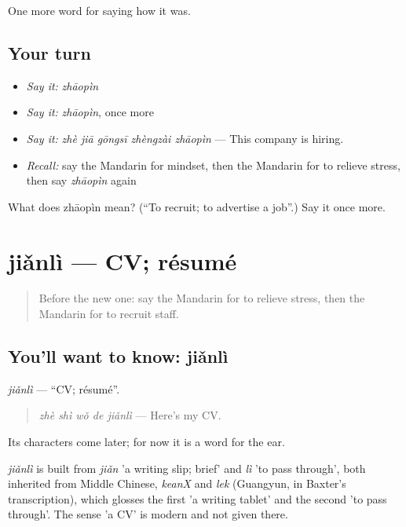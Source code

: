 \begin{grammarlens}[title={What you've built}]
One more word for saying how it was.
\end{grammarlens}

\subsection*{Your turn}
\begin{itemize}
\raggedright
  \item \emph{Say it:} \emph{zhāopìn}
  \item \emph{Say it:} \emph{zhāopìn}, once more
  \item \emph{Say it:} \emph{zhè jiā gōngsī zhèngzài zhāopìn} — This company is hiring.
  \item \emph{Recall:} say the Mandarin for mindset, then the Mandarin for to relieve stress, then say \emph{zhāopìn} again
\end{itemize}

\begin{tcolorbox}[breakable,colback=teal!4,colframe=teal!35!black,title={Before you move on}]
What does zhāopìn mean? (\textquotedblleft{}To recruit; to advertise a job\textquotedblright{}.) Say it once more.
\end{tcolorbox}
\section[jiǎnlì]{jiǎnlì — CV; résumé}

\label{lesson:ZH-C486-jianli}



\begin{quote}
Before the new one: say the Mandarin for to relieve stress, then the Mandarin for to recruit staff.
\end{quote}

\subsection*{You'll want to know: jiǎnlì}
\emph{jiǎnlì} — \textquotedblleft{}CV; résumé\textquotedblright{}.

\begin{quote}
\emph{zhè shì wǒ de jiǎnlì} — Here's my CV.
\end{quote}

Its characters come later; for now it is a word for the ear.

\begin{cousinweb}
\emph{jiǎnlì} is built from \emph{jiǎn} 'a writing slip; brief' and \emph{lì} 'to pass through', both inherited from Middle Chinese, \emph{keanX} and \emph{lek} (Guangyun, in Baxter's transcription), which glosses the first 'a writing tablet' and the second 'to pass through'. The sense 'a CV' is modern and not given there.
\end{cousinweb}

